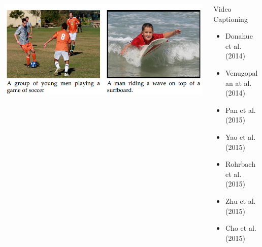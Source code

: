 \begin{frame}
    \begin{columns}            
        \begin{column}{0.6\textwidth}
            \begin{overlayarea}{\textwidth}{\textheight}
                \vspace{0.2in}
                \includegraphics[width=1\linewidth]{images/vc}
            \end{overlayarea}
        \end{column}
        \begin{column}{0.4\textwidth}
            \begin{overlayarea}{\textwidth}{\textheight}
                \begin{block}{Video Captioning}
                    \begin{itemize}
                        \item Donahue et al. (2014) 
                        \item Venugopalan at al. (2014)
                        \item Pan et al. (2015)
                        \item Yao et al. (2015)
                        \item Rohrbach et al. (2015)
                        \item Zhu et al. (2015)
                        \item Cho et al. (2015)
                    \end{itemize}
              \end{block}
            \end{overlayarea}
        \end{column}
    \end{columns}
\end{frame}


